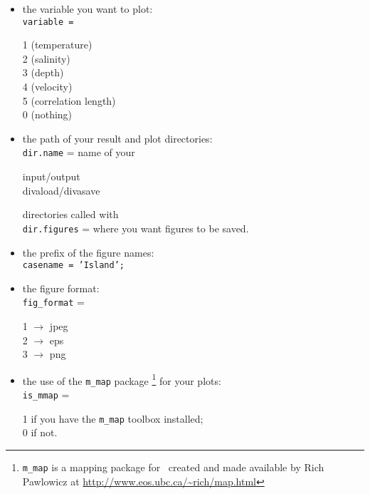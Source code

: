 \begin{itemize}

\item the variable you want to plot:\\
\texttt{variable =} \begin{minipage}[t]{6.6cm}
            1 (temperature)\\
            2 (salinity)\\
            3 (depth)\\
            4 (velocity)\\
            5 (correlation length)\\
            0 (nothing)
           \end{minipage}
           
\item the path of your result and plot directories:\\

\texttt{dir.name} = name of your  \begin{minipage}[t]{3cm}    input/output \\  divaload/divasave \end{minipage}  directories called with\\
\texttt{dir.figures} = where you want figures to be saved.

\item the prefix of the figure names:\\  
    
\texttt{casename = 'Island';}

\item the figure format:\\

\texttt{fig\_format} = \begin{minipage}[t]{5cm}
           1 $\rightarrow$ jpeg\\
           2 $\rightarrow$ eps\\
           3 $\rightarrow$ png
           \end{minipage}

\item the use of the \texttt{m\_map} package \footnote{\texttt{m\_map} is a mapping package for \matlab\, created and made available by Rich Pawlowicz at \url{http://www.eos.ubc.ca/~rich/map.html}} for your plots:\\

\texttt{is\_mmap} = \begin{minipage}[t]{5cm}
           1  if you have the \texttt{m\_map} toolbox installed;\\
           0  if not.
           \end{minipage}
\end{itemize}
 


